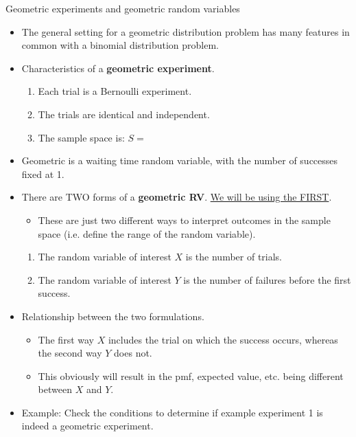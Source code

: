 \documentclass{article}
\begin{document}
Geometric experiments and geometric random variables\bigskip
\begin{itemize}
    \item The general setting for a geometric distribution problem has many features in common with a binomial distribution problem.
    \item Characteristics of a \textbf{geometric experiment}.\smallskip
    \begin{enumerate}
        \item Each trial is a Bernoulli experiment.
        \item The trials are identical and independent.
        \item The sample space is: $S = $
    \end{enumerate}\smallskip
    \item Geometric is a waiting time random variable, with the number of successes fixed at 1.
    \item There are TWO forms of a \textbf{geometric RV}. \ul{We will be using the FIRST}.\smallskip
    \begin{itemize}
        \item These are just two different ways to interpret outcomes in the sample space (i.e. define the range of the random variable).
    \end{itemize}
    \begin{enumerate}
        \item The random variable of interest $X$ is the number of trials.\bigskip
        \item The random variable of interest $Y$ is the number of failures before the first success.
    \end{enumerate}\bigskip
    \item Relationship between the two formulations.
    \begin{itemize}
        \item The first way $X$ includes the trial on which the success occurs, whereas the second way $Y$ does not.\bigskip
        \item This obviously will result in the pmf, expected value, etc. being different between $X$ and $Y$.
    \end{itemize}
    \item Example: Check the conditions to determine if example experiment 1 is indeed a geometric experiment.\vspace{30pt}
\end{itemize}\bigskip
\end{document}
